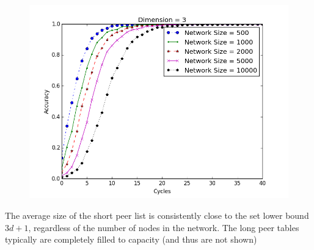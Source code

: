 \documentclass{IEEEtran}
\begin{document}
\begin{figure}
	\centering
	\includegraphics[width=\linewidth]{conv_d3}
	\label{conv3}
\end{figure}



The average size of the short peer list is consistently close to the set lower bound $3d+1$, regardless of the number of nodes in the network.   
The long peer tables typically are completely filled to capacity (and thus are not shown)
\end{document}

